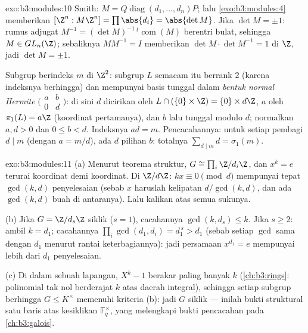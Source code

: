 \begin{solution}{exo:b3:modules:10}
Smith: $M = Q\operatorname{diag}(d_1,\dots,d_n)P$; lalu
\cref{exo:b3:modules:4} memberikan $[\Z^n : M\Z^n] = \prod\abs{d_i} =
\abs{\det M}$. Jika $\det M = \pm 1$: rumus adjugat
$M^{-1} = (\det M)^{-1}\,{}^{t}\!\operatorname{com}(M)$ berentri
bulat, sehingga $M \in GL_n(\Z)$; sebaliknya $MM^{-1} = I$
memberikan $\det M \cdot \det M^{-1} = 1$ di $\Z$, jadi $\det M = \pm1$.

Subgrup berindeks $m$ di $\Z^2$: subgrup $L$ semacam itu berrank
$2$ (karena indeksnya berhingga) dan mempunyai basis tunggal dalam \emph{bentuk
normal Hermite} $\bigl(\begin{smallmatrix} a & b\\ 0 &
d\end{smallmatrix}\bigr)$: di sini $d$ dicirikan oleh $L \cap (\{0\}
\times \Z) = \{0\} \times d\Z$, $a$ oleh $\pi_1(L) = a\Z$ (koordinat
pertamanya), dan $b$ lalu tunggal modulo $d$; normalkan $a, d
> 0$ dan $0 \leq b < d$. Indeksnya $ad = m$. Pencacahannya: untuk
setiap pembagi $d \mid m$ (dengan $a = m/d$), ada $d$ pilihan
$b$: totalnya $\sum_{d \mid m} d = \sigma_1(m)$.
\end{solution}

\begin{solution}{exo:b3:modules:11}
(a) Menurut teorema struktur, $G \cong \prod_i\Z/d_i\Z$, dan
$x^k = e$ terurai koordinat demi koordinat. Di $\Z/d\Z$: $kx \equiv 0
\pmod d$ mempunyai tepat $\gcd(k, d)$ penyelesaian (sebab $x$ haruslah
kelipatan $d/\gcd(k,d)$, dan ada $\gcd(k, d)$ buah di
antaranya). Lalu kalikan atas semua sukunya.

(b) Jika $G = \Z/d_s\Z$ siklik ($s = 1$), cacahannya
$\gcd(k, d_s) \leq k$. Jika $s \geq 2$: ambil $k = d_1$;
cacahannya $\prod_i\gcd(d_1, d_i) = d_1^{\,s} > d_1$ (sebab setiap
$\gcd$ sama dengan $d_1$ menurut rantai keterbagiannya): jadi persamaan
$x^{d_1} = e$ mempunyai lebih dari $d_1$ penyelesaian.

(c) Di dalam sebuah lapangan, $X^k - 1$ berakar paling banyak $k$
(\cref{ch:b3:rings}: polinomial tak nol berderajat $k$ atas
daerah integral), sehingga setiap subgrup berhingga $G \leq K^\times$
memenuhi kriteria (b): jadi $G$ siklik --- inilah bukti
struktural satu baris atas kesiklikan
$\mathbb F_q^\times$, yang melengkapi bukti pencacahan pada
\cref{ch:b3:galois}.
\end{solution}


